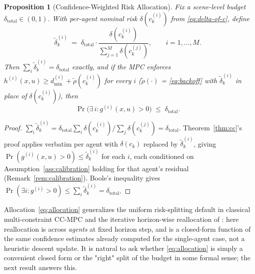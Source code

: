 \documentclass[letterpaper, 10 pt, conference]{ieeeconf}
\newtheorem{proposition}{Proposition}
\begin{document}
\begin{proposition}[Confidence-Weighted Risk Allocation]
\label{prop:allocation}
Fix a scene-level budget $\delta_{\mathrm{total}}\in(0,1)$. With per-agent nominal risk $\delta(c_k^{(i)})$ from \eqref{eq:delta-of-c}, define
\begin{equation}
\tilde\delta_k^{(i)} \;=\; \delta_{\mathrm{total}}\cdot\frac{\delta(c_k^{(i)})}{\sum_{j=1}^M \delta(c_k^{(j)})}, \qquad i=1,\dots,M. \label{eq:allocation}
\end{equation}
Then $\sum_i \tilde\delta_k^{(i)}=\delta_{\mathrm{total}}$ exactly, and if the MPC enforces $h^{(i)}(x,u)\ge d_{\min}^{(i)}+\tilde\rho(c_k^{(i)})$ for every $i$ ($\tilde\rho(\cdot)$ = \eqref{eq:backoff} with $\tilde\delta_k^{(i)}$ in place of $\delta(c_k^{(i)})$), then
\begin{equation}
\Pr\Big(\exists\, i: g^{(i)}(x,u)>0\Big) \;\le\; \delta_{\mathrm{total}}. \label{eq:whole-scene}
\end{equation}
\end{proposition}
\begin{proof}
$\sum_i\tilde\delta_k^{(i)}=\delta_{\mathrm{total}}\sum_i\delta(c_k^{(i)})/\sum_j\delta(c_k^{(j)})=\delta_{\mathrm{total}}$. Theorem~\ref{thm:cc}'s proof applies verbatim per agent with $\delta(c_k)$ replaced by $\tilde\delta_k^{(i)}$, giving $\Pr(g^{(i)}(x,u)>0)\le\tilde\delta_k^{(i)}$ for each $i$, each conditioned on Assumption~\ref{ass:calibration} holding for that agent's residual (Remark~\ref{rem:calibration}). Boole's inequality gives $\Pr(\exists i:g^{(i)}>0)\le\sum_i\tilde\delta_k^{(i)}=\delta_{\mathrm{total}}$.
\end{proof}

Allocation~\eqref{eq:allocation} generalizes the uniform risk-splitting default in classical multi-constraint CC-MPC and the iterative horizon-wise reallocation of \cite{ono2008iterative}: here reallocation is across \emph{agents} at fixed horizon step, and is a closed-form function of the same confidence estimates already computed for the single-agent case, not a heuristic descent update. It is natural to ask whether \eqref{eq:allocation} is simply a convenient closed form or the "right" split of the budget in some formal sense; the next result answers this.
\end{document}
